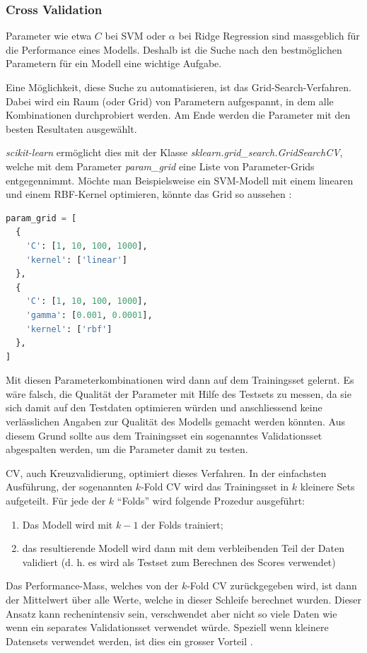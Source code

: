 \documentclass[10pt, a4paper]{article}
\begin{document}



\subsubsection{Cross Validation} \label{sec:cv}
Parameter wie etwa \(C\) bei \ac{SVM} oder \(\alpha\) bei Ridge Regression sind massgeblich für die Performance eines Modells. Deshalb ist die Suche nach den bestmöglichen Parametern für ein Modell eine wichtige Aufgabe.

Eine Möglichkeit, diese Suche zu automatisieren, ist das Grid-Search-Ver\-fahr\-en. Dabei wird ein Raum (oder Grid) von Parametern aufgespannt, in dem alle Kombinationen durchprobiert werden. Am Ende werden die Parameter mit den besten Resultaten ausgewählt.

\emph{scikit-learn} ermöglicht dies mit der Klasse \textit{sklearn.grid\_search.GridSearchCV}, welche mit dem Parameter \textit{param\_grid} eine Liste von Parameter-Grids entgegennimmt. Möchte man Beispielsweise ein \ac{SVM}-Modell mit einem linearen und einem \ac{RBF}-Kernel optimieren, könnte das Grid so aussehen \cite{sklearngridsearch}:

\noindent
\begin{lstlisting}[language=Python, frame=single, caption={Parameter Grid}]
param_grid = [
  {
    'C': [1, 10, 100, 1000], 
	'kernel': ['linear']
  },
  {
    'C': [1, 10, 100, 1000],
    'gamma': [0.001, 0.0001],
    'kernel': ['rbf']
  },
]
\end{lstlisting}

Mit diesen Parameterkombinationen wird dann auf dem Trainingsset gelernt. Es wäre falsch, die Qualität der Parameter mit Hilfe des Testsets zu messen, da sie sich damit auf den Testdaten optimieren würden und anschliessend keine verlässlichen Angaben zur Qualität des Modells gemacht werden könnten. Aus diesem Grund sollte aus dem Trainingsset ein sogenanntes Validationsset abgespalten werden, um die Parameter damit zu testen.

\ac{CV}, auch Kreuzvalidierung, optimiert dieses Verfahren. In der einfachsten Ausführung, der sogenannten \(k\)-Fold \ac{CV} wird das Trainingsset in \(k\) kleinere Sets aufgeteilt. Für jede der \(k\) ``Folds'' wird folgende Prozedur ausgeführt:
\begin{enumerate}
	\item Das Modell wird mit \(k-1\) der Folds trainiert;
	\item das resultierende Modell wird dann mit dem verbleibenden Teil der Daten validiert (d. h. es wird als Testset zum Berechnen des Scores verwendet) 
\end{enumerate}
Das Performance-Mass, welches von der \(k\)-Fold \ac{CV} zurückgegeben wird, ist dann der Mittelwert über alle Werte, welche in dieser Schleife berechnet wurden. Dieser Ansatz kann rechenintensiv sein, verschwendet aber nicht so viele Daten wie wenn ein separates Validationsset verwendet würde. Speziell wenn kleinere Datensets verwendet werden, ist dies ein grosser Vorteil \cite{sklearncv}.
\end{document}
